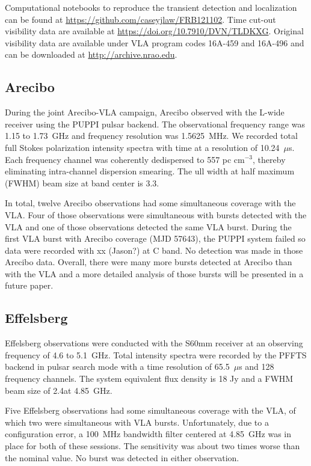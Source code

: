 \documentclass[twocolumn]{aastex61}
\begin{document}
Computational notebooks to reproduce the transient detection and localization can be found at \url{https://github.com/caseyjlaw/FRB121102}. Time cut-out visibility data are available at \url{https://doi.org/10.7910/DVN/TLDKXG}. Original visibility data are available under VLA program codes 16A-459 and 16A-496 and can be downloaded at \url{http://archive.nrao.edu}.

\subsection{Arecibo}

During the joint Arecibo-VLA campaign, Arecibo observed with the L-wide receiver using the PUPPI pulsar backend. The observational frequency range was 1.15 to 1.73~GHz and frequency resolution was 1.5625~MHz. We recorded total full Stokes polarization intensity spectra with time at a resolution of 10.24~$\mu$s. Each frequency channel was coherently dedispersed to 557 pc cm$^{-3}$, thereby eliminating intra-channel dispersion smearing. The ull width at half maximum (FWHM) beam size at band center is 3.3\arcmin.

In total, twelve Arecibo observations had some simultaneous coverage with the VLA. Four of those observations were simultaneous with bursts detected with the VLA and one of those observations detected the same VLA burst. During the first VLA burst with Arecibo coverage (MJD 57643), the PUPPI system failed so data were recorded with {\color{red} xx (Jason?)} at C band. No detection was made in those Arecibo data. Overall, there were many more bursts detected at Arecibo than with the VLA and a more detailed analysis of those bursts will be presented in a future paper.

\subsection{Effelsberg}

Effelsberg observations were conducted with the S60mm receiver at an observing frequency of 4.6 to 5.1~GHz. Total intensity spectra were recorded by the PFFTS backend in pulsar search mode with a time resolution of 65.5~$\mu$s and 128 frequency channels. The system equivalent flux density is 18 Jy and a FWHM beam size of 2.4\arcmin at 4.85~GHz. 

Five Effelsberg observations had some simultaneous coverage with the VLA, of which two were simultaneous with VLA bursts. Unfortunately, due to a configuration error, a 100~MHz bandwidth filter centered at 4.85~GHz was in place for both of these sessions. The sensitivity was about two times worse than the nominal value. No burst was detected in either observation.
\end{document}
